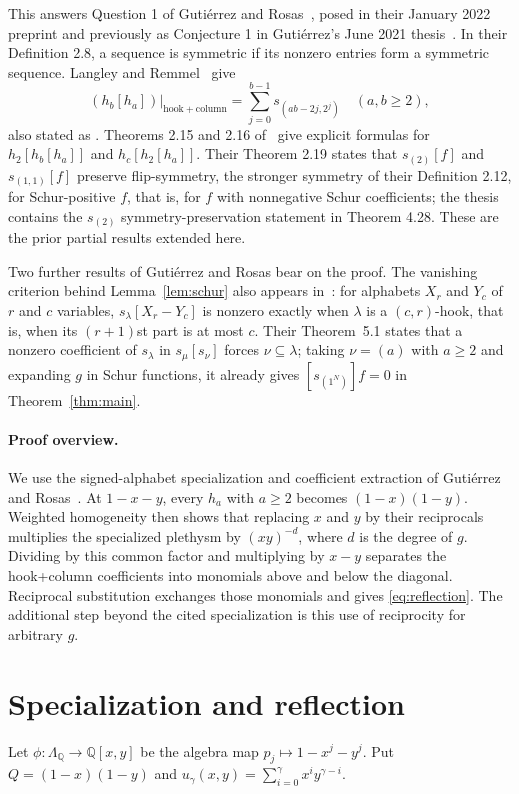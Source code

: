 \documentclass[11pt]{article}
\newcommand{\Q}{\mathbb{Q}}
\begin{document}
This answers Question 1 of Gutiérrez and Rosas~\cite[Section 4]{GR}, posed in their January 2022 preprint and previously as Conjecture 1 in Gutiérrez's June 2021 thesis~\cite{thesis}. In their Definition 2.8, a sequence is symmetric if its nonzero entries form a symmetric sequence. Langley and Remmel~\cite[Theorem 4.8]{LR} give
\[
 (h_b[h_a])\big|_{\mathrm{hook+column}}
   =\sum_{j=0}^{b-1}s_{(ab-2j,2^j)}\quad(a,b\geq2),
\]
also stated as \cite[Theorem 2.14]{GR}. Theorems 2.15 and 2.16 of~\cite{GR} give explicit formulas for $h_2[h_b[h_a]]$ and $h_c[h_2[h_a]]$. Their Theorem 2.19 states that $s_{(2)}[f]$ and $s_{(1,1)}[f]$ preserve flip-symmetry, the stronger symmetry of their Definition 2.12, for Schur-positive $f$, that is, for $f$ with nonnegative Schur coefficients; the thesis contains the $s_{(2)}$ symmetry-preservation statement in Theorem 4.28. These are the prior partial results extended here.

Two further results of Gutiérrez and Rosas bear on the proof. The vanishing criterion behind Lemma~\ref{lem:schur} also appears in~\cite[Lemma 3.1]{positivity}: for alphabets $X_r$ and $Y_c$ of $r$ and $c$ variables, $s_\lambda[X_r-Y_c]$ is nonzero exactly when $\lambda$ is a $(c,r)$-hook, that is, when its $(r+1)$st part is at most $c$. Their Theorem~5.1 states that a nonzero coefficient of $s_\lambda$ in $s_\mu[s_\nu]$ forces $\nu\subseteq\lambda$; taking $\nu=(a)$ with $a\geq2$ and expanding $g$ in Schur functions, it already gives $[s_{(1^N)}]f=0$ in Theorem~\ref{thm:main}.

\paragraph{Proof overview.}
We use the signed-alphabet specialization and coefficient extraction of Gutiérrez and Rosas~\cite[Lemma 3.8]{GR}. At $1-x-y$, every $h_a$ with $a\geq2$ becomes $(1-x)(1-y)$. Weighted homogeneity then shows that replacing $x$ and $y$ by their reciprocals multiplies the specialized plethysm by $(xy)^{-d}$, where $d$ is the degree of $g$. Dividing by this common factor and multiplying by $x-y$ separates the hook+column coefficients into monomials above and below the diagonal. Reciprocal substitution exchanges those monomials and gives \eqref{eq:reflection}. The additional step beyond the cited specialization is this use of reciprocity for arbitrary $g$.

\section{Specialization and reflection}
Let $\phi:\Lambda_{\Q}\to\Q[x,y]$ be the algebra map $p_j\mapsto1-x^j-y^j$. Put $Q=(1-x)(1-y)$ and $u_\gamma(x,y)=\sum_{i=0}^\gamma x^i y^{\gamma-i}$.
\end{document}
